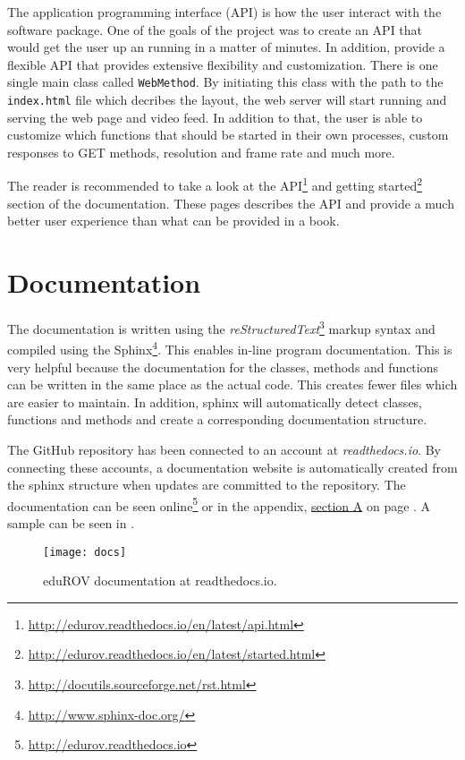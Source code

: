 The application programming interface (API) is how the user interact with the software package. One of the goals of the project was to create an API that would get the user up an running in a matter of minutes. In addition, provide a flexible API that provides extensive flexibility and customization. There is one single main class called \texttt{WebMethod}. By initiating this class with the path to the \texttt{index.html} file which decribes the layout, the web server will start running and serving the web page and video feed. In addition to that, the user is able to customize which functions that should be started in their own processes, custom responses to GET methods, resolution and frame rate and much more.

The reader is recommended to take a look at the API\footnote{\url{http://edurov.readthedocs.io/en/latest/api.html}} and getting started\footnote{\url{http://edurov.readthedocs.io/en/latest/started.html}} section of the documentation. These pages describes the API and provide a much better user experience than what can be provided in a book. 


\section{Documentation}


The documentation is written using the \emph{reStructuredText}\footnote{\url{http://docutils.sourceforge.net/rst.html}} markup syntax and compiled using the Sphinx\footnote{\url{http://www.sphinx-doc.org/}}. This enables in-line program documentation. This is very helpful because the documentation for the classes, methods and functions can be written in the same place as the actual code. This creates fewer files which are easier to maintain. In addition, sphinx will automatically detect classes, functions and methods and create a corresponding documentation structure.

The GitHub repository has been connected to an account at \emph{readthedocs.io}. By connecting these accounts, a documentation website is automatically created from the sphinx structure when updates are committed to the repository. The documentation can be seen online\footnote{\url{http://edurov.readthedocs.io}} or in the appendix, \hyperref[appDoc]{section A} on page \pageref{appDoc}. A sample can be seen in .

\begin{figure}[h!]
    \centering
    \texttt{[image: docs]}
    \caption{eduROV documentation at readthedocs.io.}
    \label{docs}
\end{figure}
\clearpage
